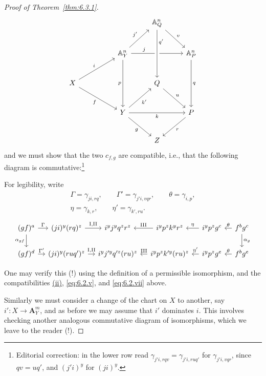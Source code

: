 \begin{proof}[Proof of Theorem~\ref{thm:6.3.1}]
\[\begin{tikzcd}[row sep=2.5em, column sep=2.5em]
	& & & \mathbb{A}^n_Q \arrow[rd, "v"] & \\
	& & \mathbb{A}^n_Y \arrow[ru, "j'"] \arrow[rr, "j" near start] \arrow[dd, "p"'] & & \mathbb{A}^n_P \arrow[dd, "q"] \\
	X \arrow[rru, "i"] \arrow[rrd, "f"'] & & & Q \arrow[rd, "u"] & \\
	& & Y \arrow[ru, "k'"'] \arrow[rr, "k"'] \arrow[rd, "g"'] & & P \arrow[ld, "r"] \\
	& & & Z &
	\arrow[from=1-4, to=3-4, "q'" near start, crossing over]
\end{tikzcd}\]
and we must show that the two $c_{f,g}$ are compatible, i.e., that the following diagram is commutative:\footnote{Editorial correction: in the lower row read $\gamma_{j'i,rqv}=\gamma_{j'i,ruq'}$ for $\gamma_{j'i,vqr}$, since $qv=uq'$, and $(j'i)^y$ for $(ji)^y$.}
\begin{samepage}
For legibility, write
\[
\begin{gathered}
\Gamma=\gamma_{ji,rq},\qquad \Gamma'=\gamma_{j'i,vqr},\qquad
\theta=\gamma_{i,p},\\
\eta=\gamma_{k,r},\qquad \eta'=\gamma_{k',ru}.
\end{gathered}
\]
\[\begin{tikzcd}[column sep=1em]
	(gf)^a \arrow[r, "\Gamma"] \arrow[d, "\alpha_{gf}"'] & (ji)^y(rq)^z \arrow[r, "\mathrm{I,II}"] & i^y j^y q^z r^z & i^y p^z k^y r^z \arrow[l, "\mathrm{III}"'] & i^y p^z g^c \arrow[l, "\eta"'] & f^b g^c \arrow[l, "\theta"'] \arrow[d, "\alpha_{g}"] \\
	(gf)^d \arrow[r, "\Gamma'"] & (ji)^y(ruq')^z \arrow[r, "\mathrm{I,II}"] & i^y j'^y q'^z (ru)^z & i^y p^z k'^y (ru)^z \arrow[l, "\mathrm{III}"'] & i^y p^z g^e \arrow[l, "\eta'"'] & f^b g^e \arrow[l, "\theta"']
\end{tikzcd}\]
\end{samepage}

One may verify this (!) using the definition of a permissible isomorphism, and the compatibilities \hyperref[compat:6.2.ii]{(ii)}, \eqref{eq:6.2.v}, and \eqref{eq:6.2.vii} above.

Similarly we must consider a change of the chart on $X$ to another, say $i'\colon X\to\mathbf{A}_Y^{m}$, and as before we may assume that $i'$ dominates $i$. This involves checking another analogous commutative diagram of isomorphisms, which we leave to the reader (!).

\par\endgroup


\end{proof}
